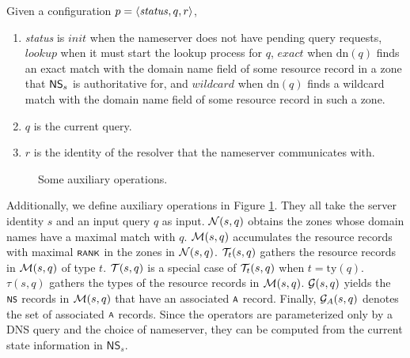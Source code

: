 Given a configuration $p = \tup{\mathit{status}, q, r}$,
\begin{enumerate}
	\item \emph{status} is $\mathit{init}$ when the nameserver does not have pending query requests, $\mathit{lookup}$ when it must start the lookup process for $q$, $\mathit{exact}$ when $\text{dn}(q)$ finds an exact match with the domain name field of some resource record in a zone that $\ns{s}$ is authoritative for, and $\mathit{wildcard}$ when $\text{dn}(q)$ finds a wildcard match with the domain name field of some resource record in such a zone.
	\item $q$ is the current query.
	\item $r$ is the identity of the resolver that the nameserver communicates with.
\end{enumerate}
\begin{figure}
	\captionsetup{skip=5pt}
	\caption{\label{fig:aux-op}Some auxiliary operations. }
\end{figure}


Additionally, we define auxiliary operations in Figure \ref{fig:aux-op}. They
all take the server identity $s$ and an input query
$q$ as input. ${\cal N}(s,q)$ obtains the zones whose domain names have
a maximal match with $q$. ${\cal M}(s,q)$ accumulates the resource
records with maximal $\scrsf{rank}$ in the zones in ${\cal N}(s,q)$. ${\cal T}_{t}(s,q)$ gathers the resource records in ${\cal M}(s,q)$
of type $t$. ${\cal T}(s,q)$ is a special case of ${\cal T}_{t}(s,q)$
when $t=\text{ty}(q)$. $\tau(s,q)$ gathers the types of the
resource records in ${\cal M}(s,q)$. ${\cal G}(s,q)$ yields
the $\scrsf{NS}$ records in ${\cal M}(s,q)$ that have an associated $\scrsf{A}$ record. Finally, ${\cal G}_{A}(s,q)$ denotes the set of associated $\scrsf{A}$ records. Since the operators are parameterized only by a DNS query and the
choice of nameserver, they can be computed from the current state
information in $\mathsf{NS}_{s}$.

